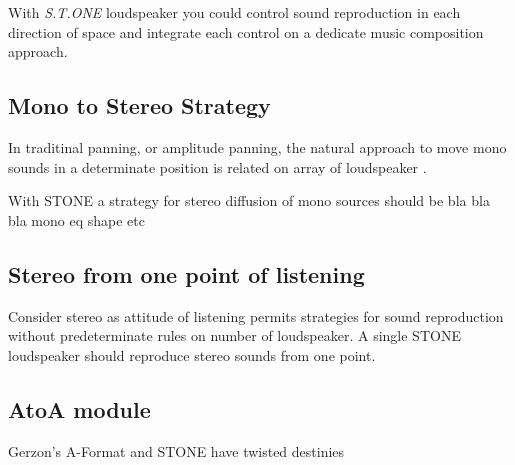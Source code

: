 \documentclass{article}
\begin{document}
With \emph{S.T.ONE} loudspeaker you could control sound reproduction in each direction of
space and integrate each control on a dedicate music composition approach.


\subsection{Mono to Stereo Strategy}
\label{sec:m2st}

In traditinal panning, or amplitude panning, the natural approach to move mono sounds in a
determinate position is related on array of loudspeaker .

With STONE a strategy for stereo diffusion of mono sources should be bla bla bla mono eq shape etc


\subsection{Stereo from one point of listening}
\label{sec:stereo}

Consider stereo as attitude of listening permits strategies for sound reproduction without
predeterminate rules on number of loudspeaker. A single STONE loudspeaker should reproduce stereo
sounds from one point.


\subsection{AtoA module}
\label{sec:atoa}

Gerzon's A-Format and STONE have twisted destinies

%
\end{document}
